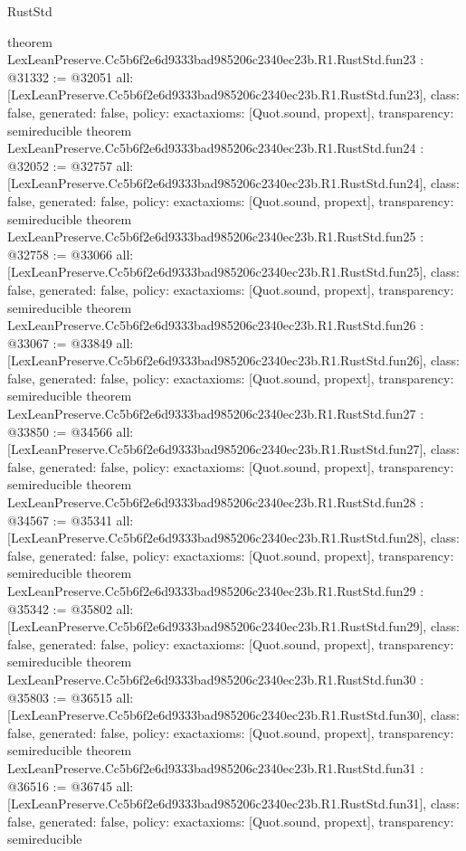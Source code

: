 \begin{lexlean}{RustStd}
\begin{coremodule}
{}
theorem LexLeanPreserve.Cc5b6f2e6d9333bad985206c2340ec23b.R1.RustStd.fun23 : @31332 := @32051 {
  all: [LexLeanPreserve.Cc5b6f2e6d9333bad985206c2340ec23b.R1.RustStd.fun23],
  class: false,
  generated: false,
  policy: exact{axioms: [Quot.sound, propext]},
  transparency: semireducible
}
theorem LexLeanPreserve.Cc5b6f2e6d9333bad985206c2340ec23b.R1.RustStd.fun24 : @32052 := @32757 {
  all: [LexLeanPreserve.Cc5b6f2e6d9333bad985206c2340ec23b.R1.RustStd.fun24],
  class: false,
  generated: false,
  policy: exact{axioms: [Quot.sound, propext]},
  transparency: semireducible
}
theorem LexLeanPreserve.Cc5b6f2e6d9333bad985206c2340ec23b.R1.RustStd.fun25 : @32758 := @33066 {
  all: [LexLeanPreserve.Cc5b6f2e6d9333bad985206c2340ec23b.R1.RustStd.fun25],
  class: false,
  generated: false,
  policy: exact{axioms: [Quot.sound, propext]},
  transparency: semireducible
}
theorem LexLeanPreserve.Cc5b6f2e6d9333bad985206c2340ec23b.R1.RustStd.fun26 : @33067 := @33849 {
  all: [LexLeanPreserve.Cc5b6f2e6d9333bad985206c2340ec23b.R1.RustStd.fun26],
  class: false,
  generated: false,
  policy: exact{axioms: [Quot.sound, propext]},
  transparency: semireducible
}
theorem LexLeanPreserve.Cc5b6f2e6d9333bad985206c2340ec23b.R1.RustStd.fun27 : @33850 := @34566 {
  all: [LexLeanPreserve.Cc5b6f2e6d9333bad985206c2340ec23b.R1.RustStd.fun27],
  class: false,
  generated: false,
  policy: exact{axioms: [Quot.sound, propext]},
  transparency: semireducible
}
theorem LexLeanPreserve.Cc5b6f2e6d9333bad985206c2340ec23b.R1.RustStd.fun28 : @34567 := @35341 {
  all: [LexLeanPreserve.Cc5b6f2e6d9333bad985206c2340ec23b.R1.RustStd.fun28],
  class: false,
  generated: false,
  policy: exact{axioms: [Quot.sound, propext]},
  transparency: semireducible
}
theorem LexLeanPreserve.Cc5b6f2e6d9333bad985206c2340ec23b.R1.RustStd.fun29 : @35342 := @35802 {
  all: [LexLeanPreserve.Cc5b6f2e6d9333bad985206c2340ec23b.R1.RustStd.fun29],
  class: false,
  generated: false,
  policy: exact{axioms: [Quot.sound, propext]},
  transparency: semireducible
}
theorem LexLeanPreserve.Cc5b6f2e6d9333bad985206c2340ec23b.R1.RustStd.fun30 : @35803 := @36515 {
  all: [LexLeanPreserve.Cc5b6f2e6d9333bad985206c2340ec23b.R1.RustStd.fun30],
  class: false,
  generated: false,
  policy: exact{axioms: [Quot.sound, propext]},
  transparency: semireducible
}
theorem LexLeanPreserve.Cc5b6f2e6d9333bad985206c2340ec23b.R1.RustStd.fun31 : @36516 := @36745 {
  all: [LexLeanPreserve.Cc5b6f2e6d9333bad985206c2340ec23b.R1.RustStd.fun31],
  class: false,
  generated: false,
  policy: exact{axioms: [Quot.sound, propext]},
  transparency: semireducible
}
\end{coremodule}
\end{lexlean}
